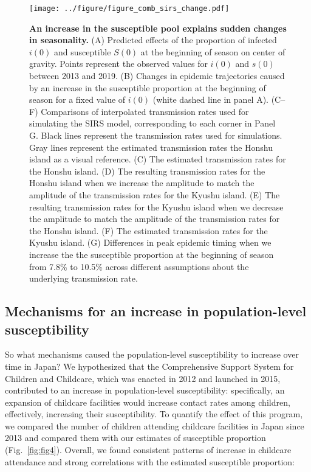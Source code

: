 \documentclass[12pt]{article}
\newcommand{\fref}[1]{Fig.~\ref{fig:#1}}
\begin{document}
\begin{figure}[!th]
\texttt{[image: ../figure/figure\_comb\_sirs\_change.pdf]}
\caption{
\textbf{An increase in the susceptible pool explains sudden changes in seasonality.}
(A) Predicted effects of the proportion of infected $i(0)$ and susceptible $S(0)$ at the beginning of season on center of gravity.
Points represent the observed values for $i(0)$ and $s(0)$ between 2013 and 2019.
(B) Changes in epidemic trajectories caused by an increase in the susceptible proportion at the beginning of season for a fixed value of $i(0)$ (white dashed line in panel A).
(C--F) Comparisons of interpolated transmission rates used for simulating the SIRS model, corresponding to each corner in Panel G. 
Black lines represent the transmission rates used for simulations. 
Gray lines represent the estimated transmission rates the Honshu island as a visual reference.
(C) The estimated transmission rates for the Honshu island.
(D) The resulting transmission rates for the Honshu island when we increase the amplitude to match the amplitude of the transmission rates for the Kyushu island.
(E) The resulting transmission rates for the Kyushu island when we decrease the amplitude to match the amplitude of the transmission rates for the Honshu island.
(F) The estimated transmission rates for the Kyushu island.
(G) Differences in peak epidemic timing when we increase the the susceptible proportion at the beginning of season from 7.8\% to 10.5\% across different assumptions about the underlying transmission rate. 
}
\label{fig:fig3}
\end{figure}

\subsection*{Mechanisms for an increase in population-level susceptibility}

So what mechanisms caused the population-level susceptibility to increase over time in Japan?
We hypothesized that the Comprehensive Support System for Children and Childcare, which was enacted in 2012 and launched in 2015, contributed to an increase in population-level susceptibility:
specifically, an expansion of childcare facilities would increase contact rates among children, effectively, increasing their susceptibility.
To quantify the effect of this program, we compared the number of children attending childcare facilities in Japan since 2013 and compared them with our estimates of susceptible proportion (\fref{fig4}).
Overall, we found consistent patterns of increase in childcare attendance and strong correlations with the estimated susceptible proportion: 
\end{document}
